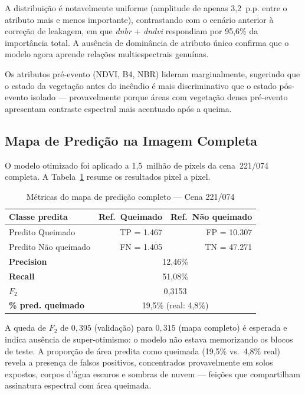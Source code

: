 \documentclass[conference]{IEEEtran}
\begin{document}
A distribuição é notavelmente uniforme (amplitude de apenas 3,2~p.p. entre
o atributo mais e menos importante), contrastando com o cenário anterior à
correção de leakagem, em que \textit{dnbr} + \textit{dndvi} respondiam por
95,6\% da importância total. A ausência de dominância de atributo único
confirma que o modelo agora aprende relações multiespectrais genuínas.

Os atributos pré-evento (NDVI, B4, NBR) lideram marginalmente, sugerindo
que o estado da vegetação antes do incêndio é mais discriminativo que o
estado pós-evento isolado — provavelmente porque áreas com vegetação
densa pré-evento apresentam contraste espectral mais acentuado após a queima.

\subsection{Mapa de Predição na Imagem Completa}

O modelo otimizado foi aplicado a 1,5~milhão de pixels da cena~221/074
completa. A Tabela~\ref{tab:mapa} resume os resultados pixel a pixel.

\begin{table}[!t]
  \caption{Métricas do mapa de predição completo — Cena 221/074}
  \label{tab:mapa}
  \centering
  \begin{tabular}{lrr}
    \toprule
    \textbf{Classe predita} & \textbf{Ref.\ Queimado} & \textbf{Ref.\ Não queimado} \\
    \midrule
    Predito Queimado     & TP = 1.467 & FP = 10.307 \\
    Predito Não queimado & FN = 1.405 & TN = 47.271 \\
    \midrule
    \textbf{Precision}  & \multicolumn{2}{c}{12,46\%} \\
    \textbf{Recall}     & \multicolumn{2}{c}{51,08\%} \\
    \textbf{$F_2$}      & \multicolumn{2}{c}{0,3153}  \\
    \textbf{\% pred. queimado} & \multicolumn{2}{c}{19,5\% (real: 4,8\%)} \\
    \bottomrule
  \end{tabular}
\end{table}

A queda de $F_2$ de $0{,}395$ (validação) para $0{,}315$ (mapa completo)
é esperada e indica ausência de super-otimismo: o modelo não estava
memorizando os blocos de teste. A proporção de área predita como queimada
(19,5\% vs.\ 4,8\% real) revela a presença de falsos positivos,
concentrados provavelmente em solos expostos, corpos d'água escuros e
sombras de nuvem — feições que compartilham assinatura espectral com
área queimada.
\end{document}

